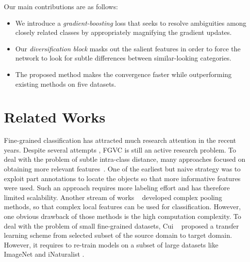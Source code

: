 \documentclass[letterpaper]{article} \usepackage{aaai20}  \usepackage{times}  \usepackage{helvet} \usepackage{courier}  \usepackage[hyphens]{url}  \usepackage{graphicx} \usepackage{multirow}
\begin{document}
Our main contributions are as follows:
\begin{itemize}\setlength{\itemsep}{0em}
\item We introduce a \emph{gradient-boosting} loss  that seeks to resolve ambiguities among closely related classes by appropriately magnifying the gradient updates.
\item Our \emph{diversification block} masks out the salient features in order to force the network to look for subtle differences between similar-looking categories.
\item The proposed method makes the convergence faster while outperforming existing methods on five datasets.
\end{itemize}

\section{Related Works}
Fine-grained classification has attracted much research attention in the recent years. 
Despite several attempts \cite{nts_2018,mamc_2018}, 
FGVC is still an active research problem. 
To deal with the problem of subtle intra-class distance, many approaches focused on obtaining more relevant features~\cite{fine_grain_annotation1,lin2015bilinear,cbp,nts_2018,mamc_2018}. One of the earliest but naive strategy was to exploit part annotations \cite{fine_grain_annotation1} to locate the objects so that more informative features were used.  Such an approach requires more labeling effort and has therefore limited scalability. Another stream of works ~\cite{lin2015bilinear,cbp,Li_2018_CVPR} developed complex pooling methods, so that complex local features can be used for classification. However, one obvious drawback of those methods is the high computation complexity. To deal with the problem of small fine-grained datasets, Cui {\etal} ~\cite{cui2018large} proposed a transfer learning scheme from selected subset of the source domain to target domain. However, it requires to re-train models on a subset of large datasets like ImageNet \cite{ILSVRC15} and iNaturalist \cite{van2018inaturalist}.
\end{document}
